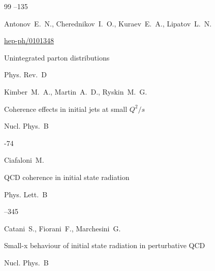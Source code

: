 \begin{thebibliography}{99}
--135

\by  Antonov~E.~N., Cherednikov~I.~O., Kuraev~E.~A., Lipatov~L.~N.







\arxiv \href{http://arxiv.org/abs/hep-ph/0101348}{hep-ph/0101348}

\paper Unintegrated parton distributions


\jour Phys. Rev.~D 



\by Kimber~M.~A., Martin~A.~D., Ryskin~M.~G.






\paper Coherence effects in initial jets at small $Q^2/s$


\jour Nucl. Phys.~B 



-74

\by Ciafaloni~M.





\paper QCD coherence in initial state radiation


\jour Phys. Lett.~B 



--345

\by Catani~S., Fiorani~F., Marchesini~G.







\paper Small-x behaviour of initial state radiation in perturbative QCD


\jour Nucl. Phys.~B 


\end{thebibliography}
